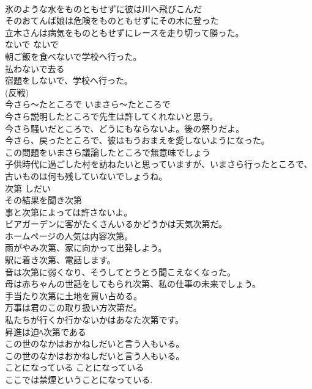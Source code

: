 \documentclass[8pt]{extreport}
\begin{document}
\begin{CJK}{UTF8}{min}
\\	氷のような水をものともせずに彼は川へ飛びこんだ   
\\	そのおてんば娘は危険をものともせずにその木に登った   
\\	立木さんは病気をものともせずにレースを走り切って勝った。  
\\	ないで	ないで	
\\	朝ご飯を食べないで学校へ行った。  
\\	払わないで去る  
\\	宿題をしないで、学校へ行った。  
\\	(反戦)
\\	今さら〜たところで	いまさら〜たところで	
\\	今さら説明したところで先生は許してくれないと思う。  
\\	今さら騒いだところで、どうにもならないよ。後の祭りだよ。  
\\	今さら、戻ったところで、彼はもうおまえを愛しないようになった。   
\\	この問題をいまさら議論したところで無意味でしょう  
\\	子供時代に過ごした村を訪ねたいと思っていますが、いまさら行ったところで、古いものは何も残していないでしょうね。   
\\	次第	しだい	
\\	その結果を聞き次第  
\\	事と次第によっては許さないよ。  
\\	ビアガーデンに客がたくさんいるかどうかは天気次第だ。   
\\	ホームページの人気は内容次第。   
\\	雨がやみ次第、家に向かって出発しよう。   
\\	駅に着き次第、電話します。   
\\	音は次第に弱くなり、そうしてとうとう聞こえなくなった。   
\\	母は赤ちゃんの世話をしてもられ次第、私の仕事の未来でしょう。  
\\	手当たり次第に土地を買い占める。   
\\	万事は君のこの取り扱い方次第だ。   
\\	私たちが行くか行かないかはあなた次第です。   
\\	昇進は迫ﾍ次第である   
\\	この世のなかはおかねしだいと言う人もいる。 
\\	この世のなかはおかねしだいと言う人もいる。 
\\	ことになっている	ことになっている	
\\	ここでは禁煙ということになっている.  

\end{CJK}
\end{document}
